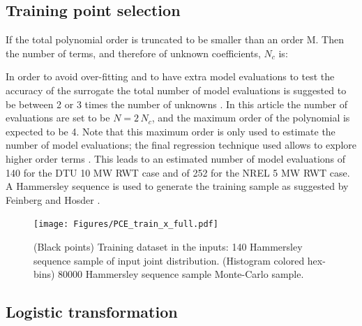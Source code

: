 \documentclass[preprint,12pt]{elsarticle}
\begin{document}

\subsection{Training point selection}

If the total polynomial order is truncated to be smaller than an order M. Then the number of terms, and therefore of unknown coefficients, $N_c$ is:


In order to avoid over-fitting and to have extra model evaluations to test the accuracy of the surrogate the total number of model evaluations is suggested to be between 2 or 3 times the number of unknowns \cite{blatman2011adaptive}. In this article the number of evaluations are set to be $N=2\,N_c$, and the maximum order of the polynomial is expected to be 4. Note that this maximum order is only used to estimate the number of model evaluations; the final regression technique used allows to explore higher order terms \cite{tibshirani1996regression, blatman2011adaptive}. This leads to an estimated number of model evaluations of 140 for the DTU 10 MW RWT case and of 252 for the NREL 5 MW RWT case. A Hammersley sequence \cite{hammersley1960monte} is used to generate the training sample as suggested by Feinberg and Hosder  \cite{feinberg2015chaospy, hosder2007efficient}.

\begin{figure}[h!]
\begin{centering}
\texttt{[image: Figures/PCE\_train\_x\_full.pdf]}
\caption{(Black points) Training dataset in the inputs: 140 Hammersley sequence sample of input joint distribution. (Histogram colored hex-bins) 80000 Hammersley sequence sample Monte-Carlo sample.}
\label{fig_PCE_train_x_full}
\end{centering}
\end{figure}

\subsection{Logistic transformation}
\end{document}
